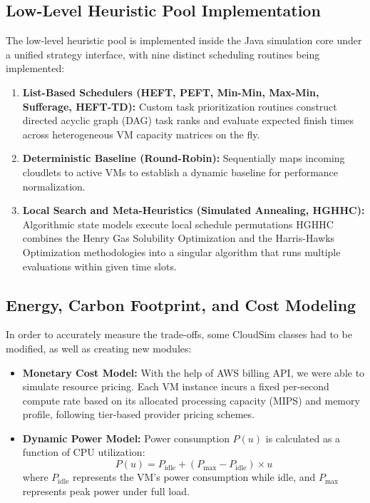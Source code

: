 \subsection{Low-Level Heuristic Pool Implementation}
The low-level heuristic pool is implemented inside the Java simulation core under a unified strategy interface, with nine distinct scheduling routines being implemented:
\begin{enumerate}
    \item \textbf{List-Based Schedulers (HEFT, PEFT, Min-Min, Max-Min, Sufferage, HEFT-TD):} Custom task prioritization routines construct directed acyclic graph (DAG) task ranks and evaluate expected finish times across heterogeneous VM capacity matrices on the fly.
    \item \textbf{Deterministic Baseline (Round-Robin):} Sequentially maps incoming cloudlets to active VMs to establish a dynamic baseline for performance normalization.
    \item \textbf{Local Search and Meta-Heuristics (Simulated Annealing, HGHHC):} Algorithmic state models execute local schedule permutations HGHHC combines the Henry Gas Solubility Optimization and the Harris-Hawks Optimization methodologies into a singular algorithm that runs multiple evaluations within given time slots.
\end{enumerate}

\subsection{Energy, Carbon Footprint, and Cost Modeling}
In order to accurately measure the trade-offs, some CloudSim classes had to be modified, as well as creating new modules:
\begin{itemize}
    \item \textbf{Monetary Cost Model:} With the help of AWS billing API, we were able to simulate resource pricing. Each VM instance incurs a fixed per-second compute rate based on its allocated processing capacity (MIPS) and memory profile, following tier-based provider pricing schemes.
    \item \textbf{Dynamic Power Model:} Power consumption $P(u)$ is calculated as a function of CPU utilization:
    \begin{equation}
    P(u) = P_{\text{idle}} + (P_{\text{max}} - P_{\text{idle}}) \times u
    \end{equation}
    where $P_{\text{idle}}$ represents the VM's power consumption while idle, and $P_{\text{max}}$ represents peak power under full load.
\end{itemize}


